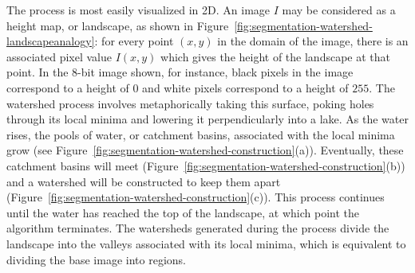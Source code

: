
The process is most easily visualized in 2D. An image $I$ may be considered as a height map, or landscape, as shown in Figure~\ref{fig:segmentation-watershed-landscapeanalogy}: for every point $(x,y)$ in the domain of the image, there is an associated pixel value $I(x,y)$ which gives the height of the landscape at that point. In the 8-bit image shown, for instance, black pixels in the image correspond to a height of $0$ and white pixels correspond to a height of $255$. The watershed process involves metaphorically taking this surface, poking holes through its local minima and lowering it perpendicularly into a lake. As the water rises, the pools of water, or catchment basins, associated with the local minima grow (see Figure~\ref{fig:segmentation-watershed-construction}(a)). Eventually, these catchment basins will meet (Figure~\ref{fig:segmentation-watershed-construction}(b)) and a watershed will be constructed to keep them apart (Figure~\ref{fig:segmentation-watershed-construction}(c)). This process continues until the water has reached the top of the landscape, at which point the algorithm terminates. The watersheds generated during the process divide the landscape into the valleys associated with its local minima, which is equivalent to dividing the base image into regions.

